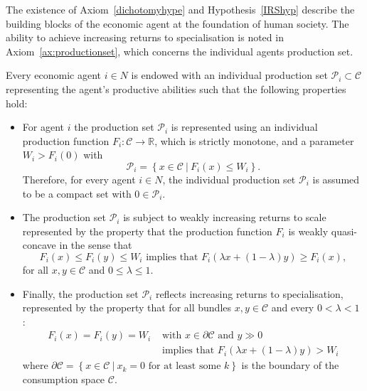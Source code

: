 The existence of Axiom~\ref{dichotomyhype} and Hypothesis~\ref{IRShyp} describe the building blocks of the economic agent at the foundation of human society. The ability to achieve increasing returns to specialisation is noted in Axiom~\ref{ax:productionset}, which concerns the individual agents production set.
\begin{axiom} \label{ax:productionset}
Every economic agent $i \in N$ is endowed with an individual production set $\mathcal{P}_{i} \subset \mathcal{C}$ representing the agent's productive abilities such that the following properties hold:
\begin{itemize}
\item For agent $i$ the production set $\mathcal{P}_{i}$ is represented using an individual production function $F_{i} \colon \mathcal{C} \rightarrow \mathbb{R}$, which is strictly monotone, and a parameter $W_{i} > F_{i}(0)$ with
\begin{equation}
\mathcal{P}_{i} = \left\{ x \in \mathcal{C} ~ | ~ F_{i}(x) \leqslant W_{i} \right\} .
\end{equation}
Therefore, for every agent $i \in N$, the individual production set $\mathcal{P}_{i}$ is assumed to be a compact set with $0 \in \mathcal{P}_{i}$.

\item The production set $\mathcal{P}_{i}$ is subject to weakly increasing returns to scale represented by the property that the production function $F_{i}$ is weakly quasi-concave in the sense that
\begin{equation}
F_{i}(x) \leqslant F_{i}(y) \leqslant W_{i} \mbox{ implies that } F_{i}( \lambda x + (1 - \lambda) y) \geqslant F_{i}(x) ,
\end{equation}
for all $x,y \in \mathcal{C}$ and $0 \leqslant \lambda \leqslant 1$.

\item Finally, the production set $\mathcal{P}_{i}$ reflects increasing returns to specialisation, represented by the property that for all bundles $x,y \in \mathcal{C}$ and every $0 < \lambda < 1$ :
\begin{align*}
F_{i}(x) = F_{i}(y) = W_{i} &\mbox{ with } x \in \partial \mathcal{C} \mbox{ and } y \gg 0 \\
&\mbox{ implies that } F_{i}( \lambda x + (1 - \lambda) y) > W_{i}
\end{align*}
where $\partial \mathcal{C} = \left\{ x \in \mathcal{C} ~ | ~ x_{k} = 0 \mbox{ for at least some } k \right\}$ is the boundary of the consumption space $\mathcal{C}$.
\end{itemize}
\end{axiom}
